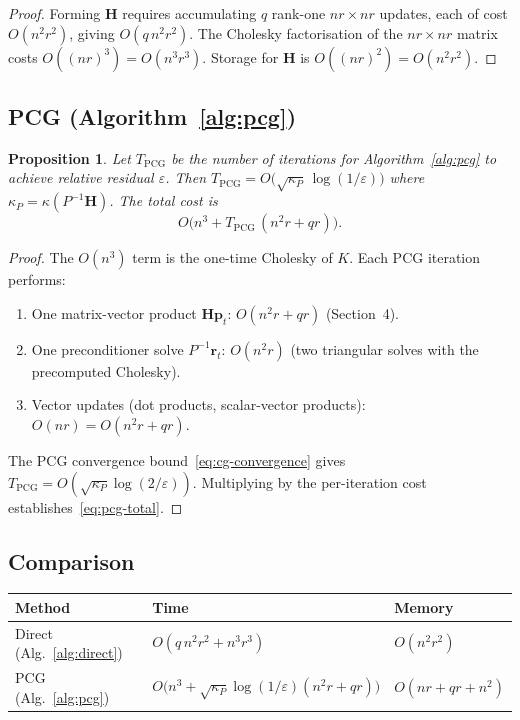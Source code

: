 \documentclass[12pt]{article}
\newtheorem{proposition}[theorem]{Proposition}
\theoremstyle{definition}
\newcommand{\bH}{\mathbf{H}}
\newcommand{\bp}{\mathbf{p}}
\newcommand{\br}{\mathbf{r}}
\begin{document}
\begin{proof}
  Forming $\bH$ requires accumulating $q$ rank-one $nr\times nr$ updates, each
  of cost $O(n^2r^2)$, giving $O(q\,n^2r^2)$.  The Cholesky factorisation of
  the $nr\times nr$ matrix costs $O((nr)^3)=O(n^3r^3)$.  Storage for $\bH$ is
  $O((nr)^2)=O(n^2r^2)$.
\end{proof}

\subsection{PCG (Algorithm~\ref{alg:pcg})}

\begin{proposition}\label{prop:pcg-complexity}
  Let $T_{\mathrm{PCG}}$ be the number of iterations for Algorithm~\ref{alg:pcg}
  to achieve relative residual $\varepsilon$.  Then
  $T_{\mathrm{PCG}} = O\!\bigl(\sqrt{\kappa_P}\,\log(1/\varepsilon)\bigr)$
  where $\kappa_P = \kappa(P^{-1}\bH)$.
  The total cost is
  \begin{equation}\label{eq:pcg-total}
    O\!\bigl(n^3 + T_{\mathrm{PCG}}\,(n^2r + qr)\bigr).
  \end{equation}
\end{proposition}

\begin{proof}
  The $O(n^3)$ term is the one-time Cholesky of $K$.  Each PCG iteration
  performs:
  \begin{enumerate}
    \item One matrix-vector product $\bH\bp_t$: $O(n^2r+qr)$ (Section~4).
    \item One preconditioner solve $P^{-1}\br_t$: $O(n^2r)$ (two triangular
          solves with the precomputed Cholesky).
    \item Vector updates (dot products, scalar-vector products):
          $O(nr) = O(n^2r+qr)$.
  \end{enumerate}
  The PCG convergence bound~\eqref{eq:cg-convergence} gives
  $T_{\mathrm{PCG}} = O(\sqrt{\kappa_P}\log(2/\varepsilon))$.
  Multiplying by the per-iteration cost establishes~\eqref{eq:pcg-total}.
\end{proof}

\subsection{Comparison}

\begin{center}
\begin{tabular}{lll}
\hline
Method & Time & Memory \\
\hline
Direct (Alg.~\ref{alg:direct}) & $O(q\,n^2r^2+n^3r^3)$ & $O(n^2r^2)$ \\
PCG (Alg.~\ref{alg:pcg}) &
  $O\!\bigl(n^3 + \sqrt{\kappa_P}\log(1/\varepsilon)(n^2r+qr)\bigr)$
  & $O(nr+qr+n^2)$ \\
\hline
\end{tabular}
\end{center}
\end{document}

